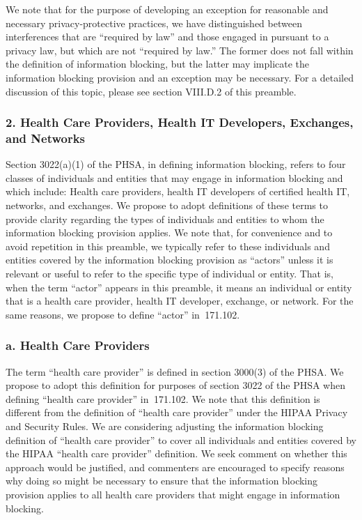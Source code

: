 \documentclass[twoside,11pt]{article}
\begin{document}
          We note that for the purpose of developing an exception for reasonable and necessary privacy-protective practices, we have distinguished between interferences that are “required by law” and those engaged in pursuant to a privacy law, but which are not “required by law.” The former does not fall within the definition of information blocking, but the latter may implicate the information blocking provision and an exception may be necessary. For a detailed discussion of this topic, please see section VIII.D.2 of this preamble.


          \subsubsection{2. Health Care Providers, Health IT Developers, Exchanges, and Networks}

          Section 3022(a)(1) of the PHSA, in defining information blocking, refers to four classes of individuals and entities that may engage in information blocking and which include: Health care providers, health IT developers of certified health IT, networks, and exchanges. We propose to adopt definitions of these terms to provide clarity regarding the types of individuals and entities to whom the information blocking provision applies. We note that, for convenience and to avoid repetition in this preamble, we typically refer to these individuals and entities covered by the information blocking provision as “actors” unless it is relevant or useful to refer to the specific type of individual or entity. That is, when the term “actor” appears in this preamble, it means an individual or entity that is a health care provider, health IT developer, exchange, or network. For the same reasons, we propose to define “actor” in \textsection{} 171.102.


          \subsubsection{a. Health Care Providers}

          The term “health care provider” is defined in section 3000(3) of the PHSA. We propose to adopt this definition for purposes of section 3022 of the PHSA when defining “health care provider” in \textsection{} 171.102. We note that this definition is different from the definition of “health care provider” under the HIPAA Privacy and Security Rules. We are considering adjusting the information blocking definition of “health care provider” to cover all individuals and entities covered by the HIPAA “health care provider” definition. We seek comment on whether this approach would be justified, and commenters are encouraged to specify reasons why doing so might be necessary to ensure that the information blocking provision applies to all health care providers that might engage in information blocking.
\end{document}
